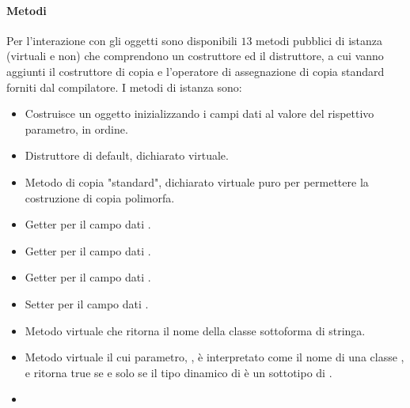 \paragraph{Metodi} %
\label{par:metodi}
Per l'interazione con gli oggetti sono disponibili $13$ metodi pubblici di istanza (virtuali e non) che comprendono un costruttore ed il distruttore, a cui vanno aggiunti il costruttore di copia e l'operatore di assegnazione di copia standard forniti dal compilatore. I metodi di istanza sono:
\begin{itemize}
	\item {}\newline
	Costruisce un oggetto inizializzando i campi dati al valore del rispettivo parametro, in ordine.
	\item {}\newline
	Distruttore di default, dichiarato virtuale.
	\item {}\newline
	Metodo di copia "standard", dichiarato virtuale puro per permettere la costruzione di copia polimorfa.
	\item {}\newline
	Getter per il campo dati .
	\item {}\newline
	Getter per il campo dati .
	\item {}\newline
	Getter per il campo dati .
	\item {}\newline
	Setter per il campo dati .
	\item {}\newline
	Metodo virtuale che ritorna il nome della classe sottoforma di stringa.
	\item {}\newline
	Metodo virtuale il cui parametro, , è interpretato come il nome di una classe , e ritorna true se e solo se il tipo dinamico di  è un sottotipo di .
	\item {}\newline

\end{itemize}
